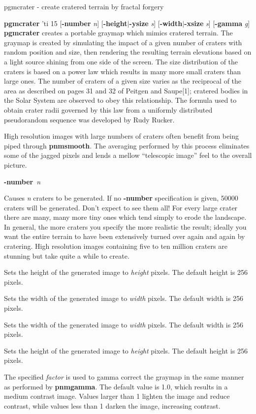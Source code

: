 pgmcrater - create cratered terrain by fractal forgery
\raggedright
{\bf pgmcrater}
'ti 15
{\rm [}{\bf -number}
{\it n}{\rm ]}
{\rm [}{\bf -height}{\rm $|$}{\bf -ysize}
{\it s}{\rm ]}
{\rm [}{\bf -width}{\rm $|$}{\bf -xsize}
{\it s}{\rm ]}
{\rm [}{\bf -gamma}
{\it g}{\rm ]}
{\bf pgmcrater}
creates a portable graymap which mimics cratered terrain.  The graymap
is created by simulating the impact of a given number of craters with
random position and size, then rendering the resulting terrain
elevations based on a light source shining from one side of the
screen.  The size distribution of the craters is based on a power law
which results in many more small craters than large ones.  The number
of craters of a given size varies as the reciprocal of the area as
described on pages 31 and 32 of Peitgen and Saupe[1]; cratered bodies
in the Solar System are observed to obey this relationship.  The
formula used to obtain crater radii governed by this law from a
uniformly distributed pseudorandom sequence was developed by Rudy
Rucker.
\par
High resolution images with large numbers of craters often benefit
from being piped through
{\bf pnmsmooth}{\rm .}
The averaging performed by this process eliminates some of the jagged
pixels and lends a mellow ``telescopic image'' feel to the overall
picture.
\begin{TPlist}{{\bf -number}{\it \ n}
}
\item[{{\bf -number}{\it \ n}
}]
Causes
{\it n}
craters to be generated.  If no
{\bf -number}
specification is given, 50000 craters will be generated.  Don't expect
to see them all!  For every large crater there are many, many more
tiny ones which tend simply to erode the landscape.  In general, the
more craters you specify the more realistic the result; ideally you
want the entire terrain to have been extensively turned over again and
again by cratering.  High resolution images containing five to ten
million craters are stunning but take quite a while to create.
\item[{{\bf -height}{\it \ height}
}]
Sets the height of the generated image to
{\it height}
pixels.  The default height is 256 pixels.
\item[{{\bf -width}{\it \ width}
}]
Sets the width of the generated image to
{\it width}
pixels.  The default width is 256 pixels.
\item[{{\bf -xsize}{\it \ width}
}]
Sets the width of the generated image to
{\it width}
pixels.  The default width is 256 pixels.
\item[{{\bf -ysize}{\it \ height}
}]
Sets the height of the generated image to
{\it height}
pixels.  The default height is 256 pixels.
\item[{{\bf -gamma}{\it \ factor}
}]
The specified
{\it factor}
is used to gamma correct the graymap in the same manner as performed
by
{\bf pnmgamma}{\rm .}
The default value is 1.0, which results in a medium contrast image.
Values larger than 1 lighten the image and reduce contrast, while
values less than 1 darken the image, increasing contrast.
\end{TPlist}

